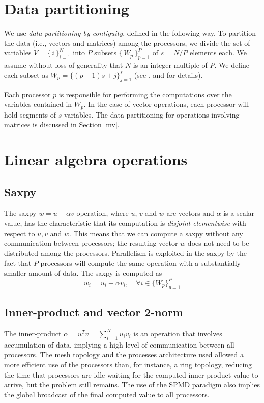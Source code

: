 \documentclass{ecai}  %
\begin{document}
\section{Data partitioning}
\label{datapart}
We use \emph{data partitioning by contiguity}, defined in the
following way. To partition the data (i.e., vectors and matrices)
among the processors, we divide the set of variables
\mbox{$V=\{\,i\,\}_{i=1}^{N}$} into $P$ subsets
$\{\,W_{p}\,\}_{p=1}^{P}$ of $s=N/P$ elements each. We assume without
loss of generality that $N$ is an integer multiple of $P$. We define
each subset as $W_{p}=\{(p-1)s+j\}_{j=1}^{s}$ (see
\cite{kn:Schofield89}, \cite{kn:daCunha92a} and \cite{kn:Atkin} for
details).

Each processor $p$ is responsible for performing the computations over
the variables contained in $W_{p}$. In the case of vector operations,
each processor will hold segments of $s$ variables. The data
partitioning for operations involving matrices is discussed in Section
\ref{mv}.

\section{Linear algebra operations}
\label{blas}
\subsection{Saxpy}
\label{saxpy}
The saxpy $w=u+\alpha v$ operation, where $u$, $v$ and $w$ are vectors
and $\alpha$ is a scalar value, has the characteristic that its
computation is \emph{disjoint elementwise} with respect to $u, v$ and
$w$. This means that we can compute a saxpy without any communication
between processors; the resulting vector $w$ does not need to be
distributed among the processors. Parallelism is exploited in the
saxpy by the fact that $P$ processors will compute the same operation
with a substantially smaller amount of data. The saxpy is computed as
\begin{equation}
w_{i}=u_{i}+\alpha v_{i},\quad \forall i\in\{W_{p}\}_{p=1}^{P}
\label{distsaxpy}
\end{equation}
\subsection{Inner-product and vector 2-norm}
\label{utv}
The inner-product $\alpha=u^{T}v=\sum_{i=1}^{N}{u_{i}v_{i}}$ is an
operation that involves accumulation of data, implying a high level of
communication between all processors. The mesh topology and the
processes architecture used allowed a more efficient use of the
processors than, for instance, a ring topology, reducing the time that
processors are idle waiting for the computed inner-product value to
arrive, but the problem still remains. The use of the SPMD paradigm
also implies the global broadcast of the final computed value to all
processors.
\end{document}
